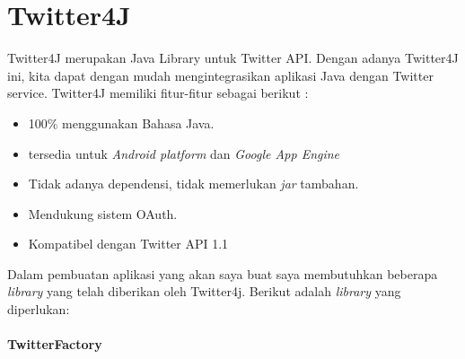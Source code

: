 \section{Twitter4J}
Twitter4J merupakan Java Library untuk Twitter API. Dengan adanya Twitter4J ini, kita dapat dengan mudah mengintegrasikan aplikasi Java dengan Twitter service. Twitter4J memiliki fitur-fitur sebagai berikut :

\begin{itemize}
	\item 100\% menggunakan Bahasa Java.
	\item tersedia untuk \textit{Android platform} dan \textit{Google App Engine}
	\item Tidak adanya dependensi, tidak memerlukan \textit{jar} tambahan.
	\item Mendukung sistem OAuth.
	\item Kompatibel dengan Twitter API 1.1
\end{itemize}

Dalam pembuatan aplikasi yang akan saya buat saya membutuhkan beberapa \textit{library} yang telah diberikan oleh Twitter4j. Berikut adalah \textit{library} yang diperlukan:
\paragraph{TwitterFactory}
	

